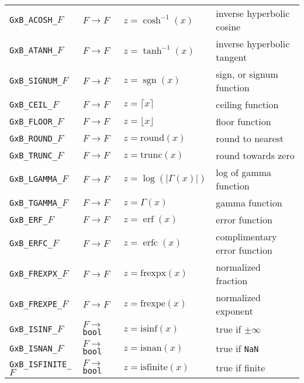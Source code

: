 \documentclass[12pt]{article}
\DeclareMathOperator{\sgn}{sgn}
\DeclareMathOperator{\erf}{erf}
\DeclareMathOperator{\erfc}{erfc}
\begin{document}
{\begin{tabular}{|llll|}
\verb'GxB_ACOSH_'$F$    & $F \rightarrow F$ & $z = \cosh^{-1}(x)$        & inverse hyperbolic cosine \\
\verb'GxB_ATANH_'$F$    & $F \rightarrow F$ & $z = \tanh^{-1}(x)$        & inverse hyperbolic tangent \\
\hline
\verb'GxB_SIGNUM_'$F$   & $F \rightarrow F$ & $z = \sgn(x)$                 & sign, or signum function \\
\verb'GxB_CEIL_'$F$     & $F \rightarrow F$ & $z = \lceil x \rceil $       & ceiling function \\
\verb'GxB_FLOOR_'$F$    & $F \rightarrow F$ & $z = \lfloor x \rfloor $     & floor function \\
\verb'GxB_ROUND_'$F$    & $F \rightarrow F$ & $z = \mbox{round}(x)$        & round to nearest \\
\verb'GxB_TRUNC_'$F$    & $F \rightarrow F$ & $z = \mbox{trunc}(x)$        & round towards zero \\
\hline
\verb'GxB_LGAMMA_'$F$   & $F \rightarrow F$ & $z = \log(|\Gamma (x)|)$  & log of gamma function \\
\verb'GxB_TGAMMA_'$F$   & $F \rightarrow F$ & $z = \Gamma(x)$        & gamma function \\
\verb'GxB_ERF_'$F$      & $F \rightarrow F$ & $z = \erf(x)$          & error function \\
\verb'GxB_ERFC_'$F$     & $F \rightarrow F$ & $z = \erfc(x)$         & complimentary error function \\
\hline
\verb'GxB_FREXPX_'$F$   & $F \rightarrow F$ & $z = \mbox{frexpx}(x)$  & normalized fraction \\
\verb'GxB_FREXPE_'$F$   & $F \rightarrow F$ & $z = \mbox{frexpe}(x)$  & normalized exponent \\
\hline
\verb'GxB_ISINF_'$F$    & $F \rightarrow $ \verb'bool' & $z = \mbox{isinf}(x)$ & true if $\pm \infty$ \\
\verb'GxB_ISNAN_'$F$    & $F \rightarrow $ \verb'bool' & $z = \mbox{isnan}(x)$ & true if \verb'NaN' \\
\verb'GxB_ISFINITE_'$F$ & $F \rightarrow $ \verb'bool' & $z = \mbox{isfinite}(x)$ & true if finite \\
\hline
\end{tabular}
\vspace{0.2in}

}
\end{document}
